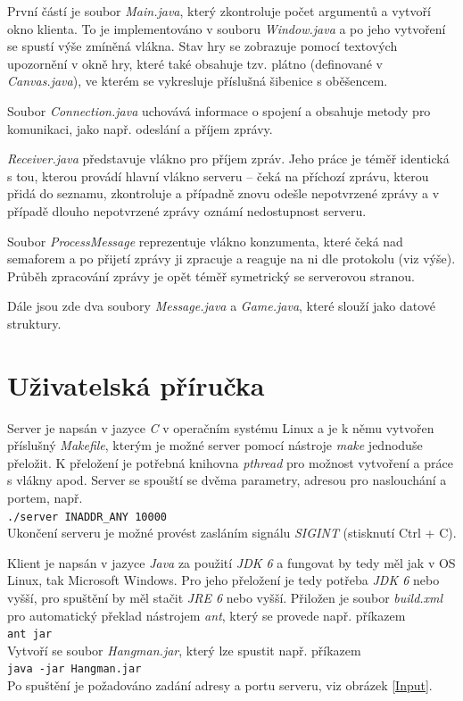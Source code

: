 \documentclass[12pt, a4paper]{article}
\begin{document}
		První částí je soubor \emph{Main.java}, který zkontroluje počet argumentů a vytvoří okno klienta. To je implementováno v souboru \emph{Window.java} a po jeho vytvoření se spustí výše zmíněná vlákna. Stav hry se zobrazuje pomocí textových upozornění v okně hry, které také obsahuje tzv. plátno (definované v \emph{Canvas.java}), ve kterém se vykresluje příslušná šibenice s oběšencem.
		
		Soubor \emph{Connection.java} uchovává informace o spojení a obsahuje metody pro komunikaci, jako např. odeslání a příjem zprávy.
		
		\emph{Receiver.java} představuje vlákno pro příjem zpráv. Jeho práce je téměř identická s tou, kterou provádí hlavní vlákno serveru -- čeká na příchozí zprávu, kterou přidá do seznamu, zkontroluje a případně znovu odešle nepotvrzené zprávy a v případě dlouho nepotvrzené zprávy oznámí nedostupnost serveru.
		
		Soubor \emph{ProcessMessage} reprezentuje vlákno konzumenta, které čeká nad semaforem a po přijetí zprávy ji zpracuje a reaguje na ni dle protokolu (viz výše). Průběh zpracování zprávy je opět téměř symetrický se serverovou stranou.
		
		Dále jsou zde dva soubory \emph{Message.java} a \emph{Game.java}, které slouží jako datové struktury.
		
	\section{Uživatelská příručka}
	Server je napsán v jazyce \emph{C} v operačním systému Linux a je k němu vytvořen příslušný \emph{Makefile}, kterým je možné server pomocí nástroje \emph{make} jednoduše přeložit. K přeložení je potřebná knihovna \emph{pthread} pro možnost vytvoření a práce s vlákny apod. Server se spouští se dvěma parametry, adresou pro naslouchání a portem, např.\\
	\texttt{./server INADDR\_ANY 10000}\\
	Ukončení serveru je možné provést zasláním signálu \emph{SIGINT} (stisknutí Ctrl + C).
	
	Klient je napsán v jazyce \emph{Java} za použití \emph{JDK 6} a fungovat by tedy měl jak v OS Linux, tak Microsoft Windows. Pro jeho přeložení je tedy potřeba \emph{JDK 6} nebo vyšší, pro spuštění by měl stačit \emph{JRE 6} nebo vyšší. Přiložen je soubor \emph{build.xml} pro automatický překlad nástrojem \emph{ant}, který se provede např. příkazem\\
	\texttt{ant jar}\\
	Vytvoří se soubor \emph{Hangman.jar}, který lze spustit např. příkazem\\
	\texttt{java -jar Hangman.jar}\\
	Po spuštění je požadováno zadání adresy a portu serveru, viz obrázek \ref{Input}.
	
\end{document}
